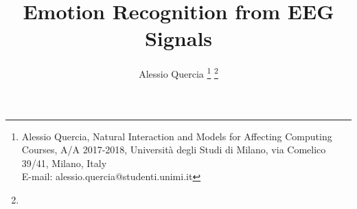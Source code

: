 \documentclass[10pt,journal,A4paper,compsoc,epsfig]{IEEEtran}
\begin{document}
%
\title{Emotion Recognition from EEG Signals}
%
%
%
%




\author{Alessio Quercia
        \thanks{Alessio Quercia, Natural Interaction and Models for Affecting Computing Courses,  A/A 2017-2018, Universit\`{a} degli Studi di Milano, via Comelico 39/41, Milano, Italy \protect\\
E-mail: alessio.quercia@studenti.unimi.it}%
\thanks{}}

% 
%
\end{document}
